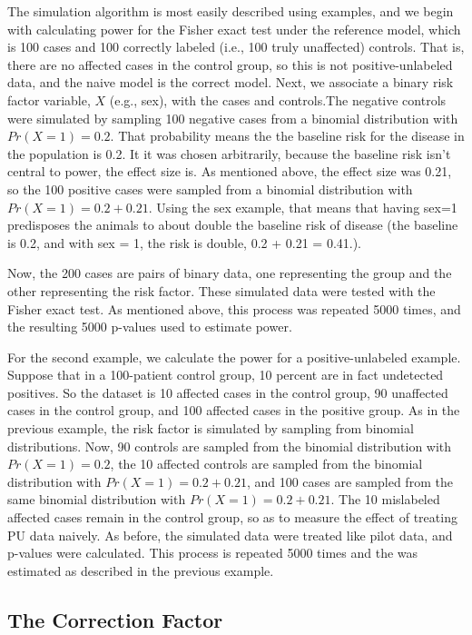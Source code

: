 \documentclass[
]{article}
\begin{document}
The simulation algorithm is most easily described using examples, and we
begin with calculating power for the Fisher exact test under the
reference model, which is 100 cases and 100 correctly labeled (i.e., 100
truly unaffected) controls. That is, there are no affected cases in the
control group, so this is not positive-unlabeled data, and the naive
model is the correct model. Next, we associate a binary risk factor
variable, \(X\) (e.g., sex), with the cases and controls.The negative
controls were simulated by sampling 100 negative cases from a binomial
distribution with \(Pr(X=1) = 0.2\). That probability means the the
baseline risk for the disease in the population is 0.2. It it was chosen
arbitrarily, because the baseline risk isn't central to power, the
effect size is. As mentioned above, the effect size was 0.21, so the 100
positive cases were sampled from a binomial distribution with
\(Pr(X=1) = 0.2 + 0.21\). Using the sex example, that means that having
sex=1 predisposes the animals to about double the baseline risk of
disease (the baseline is 0.2, and with sex = 1, the risk is double, 0.2
+ 0.21 = 0.41.).

Now, the 200 cases are pairs of binary data, one representing the group
and the other representing the risk factor. These simulated data were
tested with the Fisher exact test. As mentioned above, this process was
repeated 5000 times, and the resulting 5000 p-values used to estimate
power.

For the second example, we calculate the power for a positive-unlabeled
example. Suppose that in a 100-patient control group, 10 percent are in
fact undetected positives. So the dataset is 10 affected cases in the
control group, 90 unaffected cases in the control group, and 100
affected cases in the positive group. As in the previous example, the
risk factor is simulated by sampling from binomial distributions. Now,
90 controls are sampled from the binomial distribution with
\(Pr(X=1) = 0.2\), the 10 affected controls are sampled from the
binomial distribution with \(Pr(X=1) = 0.2+ 0.21\), and 100 cases are
sampled from the same binomial distribution with
\(Pr(X=1) = 0.2 + 0.21\). The 10 mislabeled affected cases remain in the
control group, so as to measure the effect of treating PU data naively.
As before, the simulated data were treated like pilot data, and p-values
were calculated. This process is repeated 5000 times and the was
estimated as described in the previous example.

\hypertarget{the-correction-factor}{%
\subsection{The Correction Factor}\label{the-correction-factor}}
\end{document}
